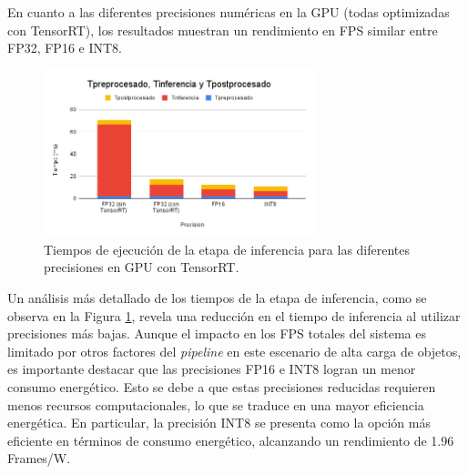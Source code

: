 \documentclass[11pt,spanish,listoffigures,listoftables]{tfgetsinf}
\begin{document}
En cuanto a las diferentes precisiones numéricas en la GPU (todas optimizadas con TensorRT), los resultados muestran un rendimiento en FPS similar entre FP32, FP16 e INT8.
\begin{figure}[H]
   \centering
   \includegraphics[width=0.7\textwidth]{images/analisis_de_la_solucion/precision_device/tiempos_inferencia_gpu.png}
   \caption{Tiempos de ejecución de la etapa de inferencia para las diferentes precisiones en GPU con TensorRT.}
   \label{fig:tiempos_inferencia_gpu}
\end{figure}
Un análisis más detallado de los tiempos de la etapa de inferencia, como se observa en la Figura \ref{fig:tiempos_inferencia_gpu}, revela una reducción en el tiempo de inferencia al utilizar precisiones más bajas. Aunque el impacto en los FPS totales del sistema es limitado por otros factores del \textit{pipeline} en este escenario de alta carga de objetos, es importante destacar que las precisiones FP16 e INT8 logran un menor consumo energético. Esto se debe a que estas precisiones reducidas requieren menos recursos computacionales, lo que se traduce en una mayor eficiencia energética. En particular, la precisión INT8 se presenta como la opción más eficiente en términos de consumo energético, alcanzando un rendimiento de 1.96 Frames/W.
\end{document}
